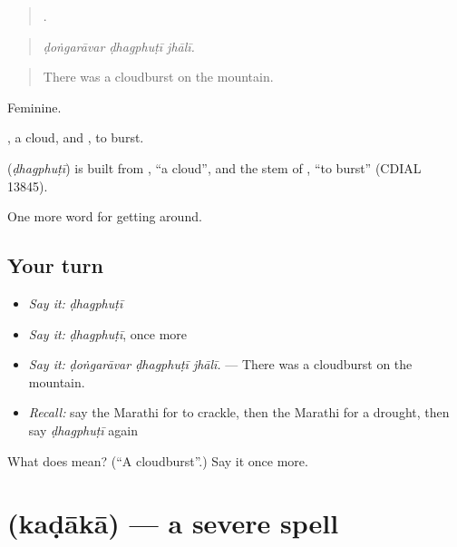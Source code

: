\begin{quote}
  .
\end{quote}

\begin{quote}
\emph{ḍoṅgarāvar ḍhagphuṭī jhālī.}
\end{quote}

\begin{quote}
There was a cloudburst on the mountain.
\end{quote}

Feminine.

, a cloud, and , to burst.

\begin{cousinweb}
\textbf{} (\emph{ḍhagphuṭī}) is built from \textbf{}, \textquotedblleft{}a cloud\textquotedblright{}, and the stem of \textbf{}, \textquotedblleft{}to burst\textquotedblright{} (CDIAL 13845).
\end{cousinweb}

\begin{grammarlens}[title={What you've built}]
One more word for getting around.
\end{grammarlens}

\subsection*{Your turn}
\begin{itemize}
\raggedright
  \item \emph{Say it:} \emph{ḍhagphuṭī}
  \item \emph{Say it:} \emph{ḍhagphuṭī}, once more
  \item \emph{Say it:} \emph{ḍoṅgarāvar ḍhagphuṭī jhālī.} — There was a cloudburst on the mountain.
  \item \emph{Recall:} say the Marathi for to crackle, then the Marathi for a drought, then say \emph{ḍhagphuṭī} again
\end{itemize}

\begin{tcolorbox}[breakable,colback=teal!4,colframe=teal!35!black,title={Before you move on}]
What does  mean? (\textquotedblleft{}A cloudburst\textquotedblright{}.) Say it once more.
\end{tcolorbox}
\section[\texorpdfstring{\mr{कडाका} (kaḍākā)}{कडाका (kaḍākā)}]{ (kaḍākā) — a severe spell}

